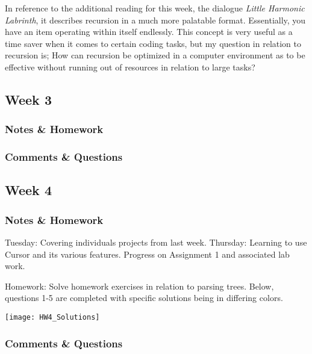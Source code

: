 \documentclass{article}
\theoremstyle{theorem}
\theoremstyle{definition}
\theoremstyle{remark}
\begin{document}
In reference to the additional reading for this week, the dialogue \textit{Little Harmonic Labrinth}, it describes recursion in a much more palatable format. Essentially, you have an item operating within itself endlessly. This concept is very useful as a time saver when it comes to certain coding tasks, but my question in relation to recursion is; How can recursion be optimized in a computer environment as to be effective without running out of resources in relation to large tasks? 

\subsection{Week 3}

\subsubsection{Notes \& Homework}

\subsubsection{Comments \& Questions}


\subsection{Week 4}

\subsubsection{Notes \& Homework}
Tuesday: Covering individuals projects from last week. 
\newline Thursday: Learning to use Cursor and its various features. Progress on Assignment 1 and associated lab work.

Homework: Solve homework exercises in relation to parsing trees. Below, questions 1-5 are completed with specific solutions being in differing colors.


\graphicspath{ {C:/Users/jrmul/OneDrive/Documents/CPSC_Courses/CPSC_354/images/} }
\begin{center} \texttt{[image: HW4\_Solutions]} \end{center}

\subsubsection{Comments \& Questions}
\end{document}
